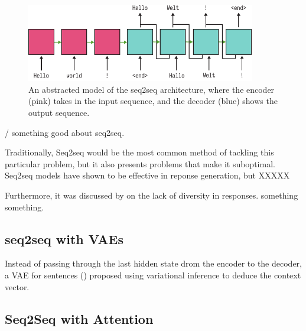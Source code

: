 \documentclass[12pt,twoside]{report}
\begin{document}
\begin{figure}[!ht]
      
	\centering
	\includegraphics[width=100mm]{diagrams/seq2seq.pdf}
	\caption{An abstracted model of the seq2seq architecture, where the encoder (pink) takes in the input sequence, and the decoder (blue) shows the output sequence.\label{seq2seq}}
  \end{figure}

/ something good about seq2seq.

Traditionally, Seq2seq would be the most common method of tackling this particular problem, but it also presents problems that make it suboptimal. Seq2seq models have shown to be effective in reponse generation, but XXXXX


Furthermore, it was discussed by \cite{jiang_why_2018} on the lack of diversity in responses. something something.

\subsection{seq2seq with VAEs}

Instead of passing through the last hidden state drom the encoder to the decoder, a VAE for sentences (\cite{bowman_generating_2015}) proposed using variational inference to deduce the context vector. 

\subsection{Seq2Seq with Attention}
\end{document}
